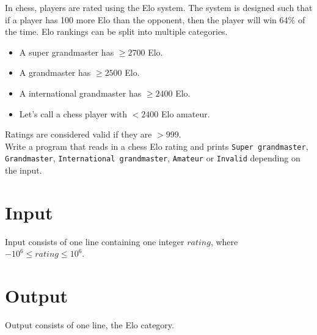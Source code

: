 
In chess, players are rated using the Elo system.
The system is designed such that if a player has 100 more Elo than the opponent,
then the player will win 64\% of the time.
Elo rankings can be split into multiple categories.
\begin{itemize}
	\item A super grandmaster has $\geq 2700$ Elo.
	\item A grandmaster has $\geq 2500$ Elo.
	\item A international grandmaster has $\geq 2400$ Elo.
	\item Let's call a chess player with $<2400$ Elo amateur.
\end{itemize}
Ratings are considered valid if they are $>999$. \\
Write a program that reads in a chess Elo rating and prints
\texttt{Super grandmaster},
\texttt{Grandmaster},
\texttt{International grandmaster},
\texttt{Amateur} or
\texttt{Invalid}
depending on the input.

\section*{Input}
Input consists of one line containing one integer $rating$,
where $-10^6 \leq rating \leq 10^6$.

\section*{Output}
Output consists of one line, the Elo category.
